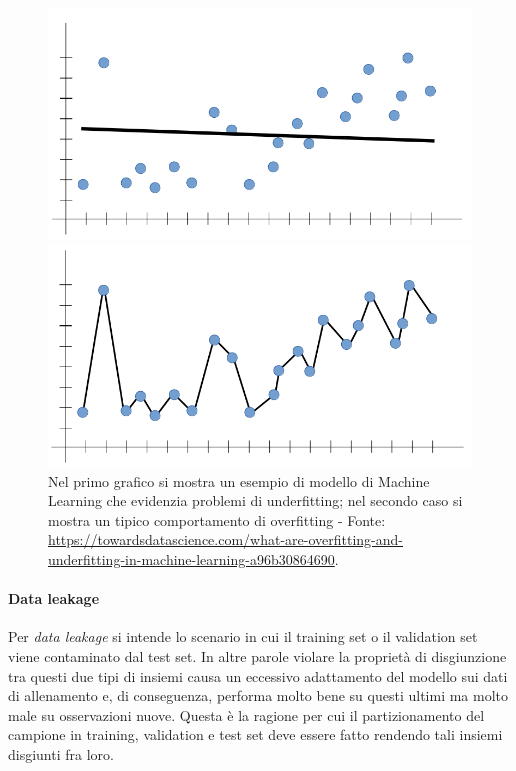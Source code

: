 \documentclass[12pt]{report}
\theoremstyle{definition}
\begin{document}
\begin{figure}
\centering
    \begin{minipage}{0.48\textwidth}
        \includegraphics[width=\linewidth]{images/underfitting.png}
    \end{minipage}
    \begin{minipage}{0.48\textwidth}
        \includegraphics[width=\linewidth]{images/overfitting.png}
    \end{minipage}
    \caption{Nel primo grafico si mostra un esempio di modello di Machine Learning che evidenzia problemi di underfitting; nel secondo caso si mostra un tipico comportamento di overfitting - Fonte: \url{https://towardsdatascience.com/what-are-overfitting-and-underfitting-in-machine-learning-a96b30864690}.}
    \label{underfittingoverfitting}
\end{figure} 

\paragraph{Data leakage} Per \textit{data leakage} si intende lo scenario in cui il training set o il validation set viene contaminato dal test set. In altre parole violare la proprietà di disgiunzione tra questi due tipi di insiemi causa un eccessivo adattamento del modello sui dati di allenamento e, di conseguenza, performa molto bene su questi ultimi ma molto male su osservazioni nuove.
Questa è la ragione per cui il partizionamento del campione in training, validation e test set deve essere fatto rendendo tali insiemi disgiunti fra loro.
\end{document}
